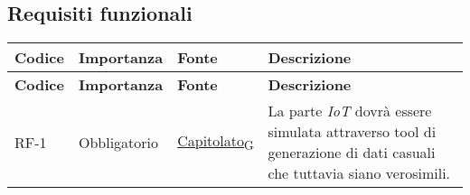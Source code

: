 \pagebreak
\subsection{Requisiti funzionali}
\begin{longtable}{|>{\centering\arraybackslash}m{}|>{\centering\arraybackslash}m{}|>{\centering\arraybackslash}m{}|>{\centering\arraybackslash}m{}|}
	\hline
	\textbf{Codice} & \textbf{Importanza} & \textbf{Fonte}                                                                                                    & \textbf{Descrizione}                                                                                                                                                                                                                                                                                                                                                                                                                                                                                                                                                                                                                                                                                                                                                                                  \\\hline
	\endfirsthead
	\hline
	\textbf{Codice} & \textbf{Importanza} & \textbf{Fonte}                                                                                                    & \textbf{Descrizione}                                                                                                                                                                                                                                                                                                                                                                                                                                                                                                                                                                                                                                                                                                                                                                                  \\\hline
	\endhead
	\hline
	RF-1            & Obbligatorio        & \href{https://7last.github.io/docs/rtb/documentazione-interna/glossario\#capitolato}{Capitolato\textsubscript{G}} & La parte \textit{IoT} dovrà essere simulata attraverso tool di generazione di dati casuali che tuttavia siano verosimili.

\end{longtable}
